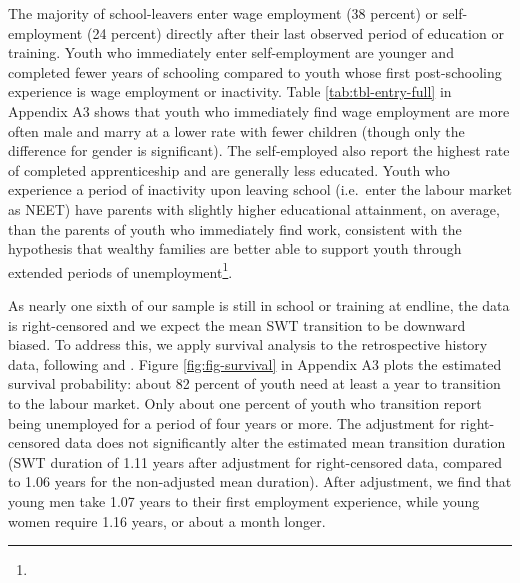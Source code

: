 \documentclass[
  a4paper, twoside, 12pt]{book}
\newcommand{\hlc}[2][color]{}
\begin{document}
The majority of school-leavers enter wage employment (38 percent) or self-employment (24 percent) directly after their last observed period of education or training. Youth who immediately enter self-employment are younger and completed fewer years of schooling compared to youth whose first post-schooling experience is wage employment or inactivity. Table \ref{tab:tbl-entry-full} in Appendix A3 shows that youth who immediately find wage employment are more often male and marry at a lower rate with fewer children (though only the difference for gender is significant). The self-employed also report the highest rate of completed apprenticeship and are generally less educated. Youth who experience a period of inactivity upon leaving school (i.e.~enter the labour market as NEET) have parents with slightly higher educational attainment, on average, than the parents of youth who immediately find work, consistent with the hypothesis that wealthy families are better able to support youth through extended periods of unemployment\footnote{\hlc[pink]{This contrasts with the findings of Bridges et al. (2017), who report the opposite: youth who enter the labour market as self-employed in Tanzania tend to have more educated parents.  This may be a result of differences in economic structure (Tanzania may have more opportunities for self-employment in sectors that require higher levels of education, such as professional services) or differences between the two countries in the cultural values attached to entrepreneurship.}}.

As nearly one sixth of our sample is still in school or training at endline, the data is right-censored and we expect the mean SWT transition to be downward biased. To address this, we apply survival analysis to the retrospective history data, following \textcite{nordman2015} and \textcite{manacorda2017}. Figure \ref{fig:fig-survival} in Appendix A3 plots the estimated survival probability: about 82 percent of youth need at least a year to transition to the labour market. Only about one percent of youth who transition report being unemployed for a period of four years or more. The adjustment for right-censored data does not significantly alter the estimated mean transition duration (SWT duration of 1.11 years after adjustment for right-censored data, compared to 1.06 years for the non-adjusted mean duration). After adjustment, we find that young men take 1.07 years to their first employment experience, while young women require 1.16 years, or about a month longer.
\end{document}
